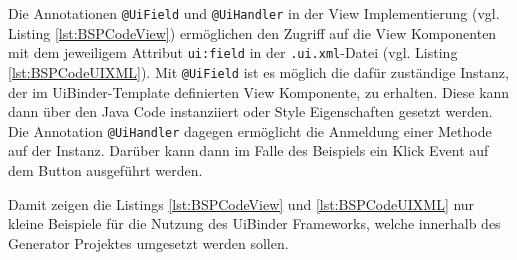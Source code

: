 Die Annotationen \texttt{@UiField} und \texttt{@UiHandler} in der View
Implementierung (vgl.
Listing \ref{lst:BSPCodeView}) ermöglichen den Zugriff auf die View Komponenten
mit dem jeweiligem Attribut \texttt{ui:field} in der \texttt{.ui.xml}-Datei
(vgl.
Listing \ref{lst:BSPCodeUIXML}). Mit \texttt{@UiField} ist es möglich die
dafür zuständige Instanz, der im UiBinder-Template definierten View
Komponente, zu erhalten.
Diese kann dann über den Java Code instanziiert oder Style Eigenschaften gesetzt werden.
Die Annotation \texttt{@UiHandler} dagegen ermöglicht die Anmeldung einer
Methode auf der Instanz. Darüber kann dann im Falle des Beispiels ein Klick Event auf dem Button
ausgeführt werden.

Damit zeigen die Listings \ref{lst:BSPCodeView} und \ref{lst:BSPCodeUIXML}
nur kleine Beispiele für die Nutzung des UiBinder Frameworks, welche
innerhalb des Generator Projektes umgesetzt werden sollen.